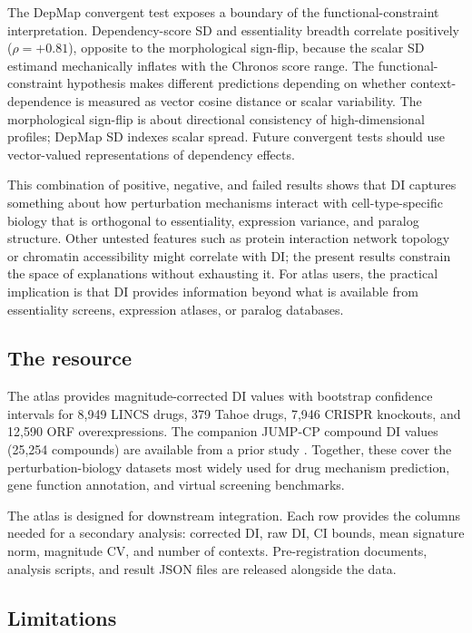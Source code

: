 \documentclass[11pt]{article}
\begin{document}
The DepMap convergent test exposes a boundary of the
functional-constraint interpretation.  Dependency-score SD and
essentiality breadth correlate positively ($\rho = +0.81$), opposite to
the morphological sign-flip, because the scalar SD estimand mechanically
inflates with the Chronos score range.  The functional-constraint
hypothesis makes different predictions depending on whether
context-dependence is measured as vector cosine distance or scalar
variability.  The morphological sign-flip is about directional
consistency of high-dimensional profiles; DepMap SD indexes scalar
spread.  Future convergent tests should use vector-valued representations
of dependency effects.

This combination of positive, negative, and failed results shows that DI
captures something about how perturbation mechanisms interact with
cell-type-specific biology that is orthogonal to essentiality,
expression variance, and paralog structure.  Other untested features
such as protein interaction network topology or chromatin accessibility
might correlate with DI; the present results constrain the space of
explanations without exhausting it.  For atlas users, the practical
implication is that DI provides information beyond what is available
from essentiality screens, expression atlases, or paralog databases.

\subsection{The resource}

The atlas provides magnitude-corrected DI values with bootstrap
confidence intervals for 8{,}949 LINCS drugs, 379 Tahoe drugs, 7{,}946
CRISPR knockouts, and 12{,}590 ORF overexpressions.  The companion JUMP-CP
compound DI values (25{,}254 compounds) are available from a prior
study \citep{tower2026confound}.  Together, these cover the
perturbation-biology datasets most widely used for drug mechanism
prediction, gene function annotation, and virtual screening
benchmarks.

The atlas is designed for downstream integration.  Each row provides the
columns needed for a secondary analysis: corrected DI, raw DI, CI
bounds, mean signature norm, magnitude CV, and number of contexts.
Pre-registration documents, analysis scripts, and result JSON files are
released alongside the data.

\subsection{Limitations}
\end{document}
